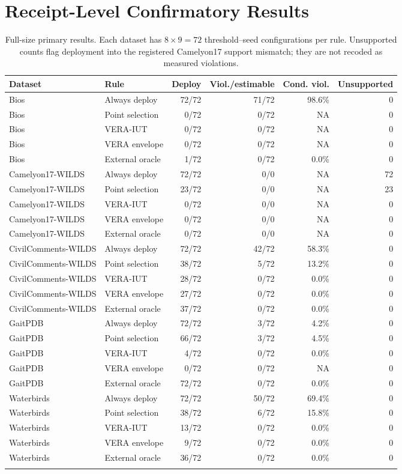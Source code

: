 \section{Receipt-Level Confirmatory Results}
\begin{table}[t]
\centering\scriptsize
\begin{tabular}{llrrrr}
\toprule
Dataset & Rule & Deploy & Viol./estimable & Cond. viol. & Unsupported \\
\midrule
Bios & Always deploy & 72/72 & 71/72 & 98.6\% & 0 \\
Bios & Point selection & 0/72 & 0/72 & NA & 0 \\
Bios & VERA-IUT & 0/72 & 0/72 & NA & 0 \\
Bios & VERA envelope & 0/72 & 0/72 & NA & 0 \\
Bios & External oracle & 1/72 & 0/72 & 0.0\% & 0 \\
\addlinespace
Camelyon17-WILDS & Always deploy & 72/72 & 0/0 & NA & 72 \\
Camelyon17-WILDS & Point selection & 23/72 & 0/0 & NA & 23 \\
Camelyon17-WILDS & VERA-IUT & 0/72 & 0/0 & NA & 0 \\
Camelyon17-WILDS & VERA envelope & 0/72 & 0/0 & NA & 0 \\
Camelyon17-WILDS & External oracle & 0/72 & 0/0 & NA & 0 \\
\addlinespace
CivilComments-WILDS & Always deploy & 72/72 & 42/72 & 58.3\% & 0 \\
CivilComments-WILDS & Point selection & 38/72 & 5/72 & 13.2\% & 0 \\
CivilComments-WILDS & VERA-IUT & 28/72 & 0/72 & 0.0\% & 0 \\
CivilComments-WILDS & VERA envelope & 27/72 & 0/72 & 0.0\% & 0 \\
CivilComments-WILDS & External oracle & 37/72 & 0/72 & 0.0\% & 0 \\
\addlinespace
GaitPDB & Always deploy & 72/72 & 3/72 & 4.2\% & 0 \\
GaitPDB & Point selection & 66/72 & 3/72 & 4.5\% & 0 \\
GaitPDB & VERA-IUT & 4/72 & 0/72 & 0.0\% & 0 \\
GaitPDB & VERA envelope & 0/72 & 0/72 & NA & 0 \\
GaitPDB & External oracle & 72/72 & 0/72 & 0.0\% & 0 \\
\addlinespace
Waterbirds & Always deploy & 72/72 & 50/72 & 69.4\% & 0 \\
Waterbirds & Point selection & 38/72 & 6/72 & 15.8\% & 0 \\
Waterbirds & VERA-IUT & 13/72 & 0/72 & 0.0\% & 0 \\
Waterbirds & VERA envelope & 9/72 & 0/72 & 0.0\% & 0 \\
Waterbirds & External oracle & 36/72 & 0/72 & 0.0\% & 0 \\
\addlinespace
\bottomrule
\end{tabular}
\caption{Full-size primary results. Each dataset has $8\times9=72$ threshold--seed configurations per rule. Unsupported counts flag deployment into the registered Camelyon17 support mismatch; they are not recoded as measured violations.}
\end{table}

